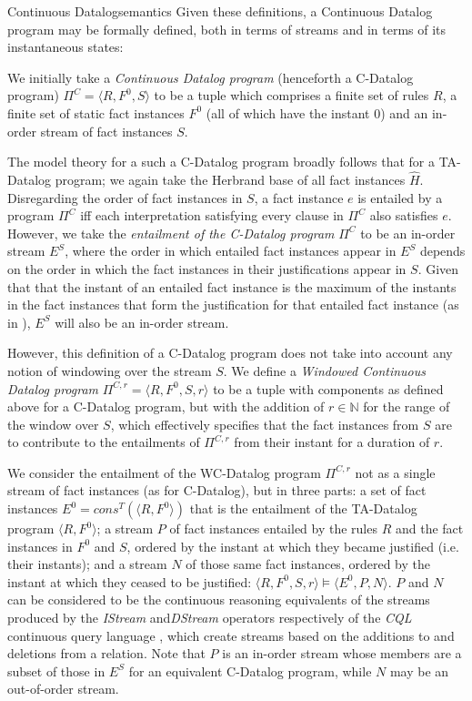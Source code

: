 \begin{nestedsection}{Continuous Datalog}{semantics}
Given these definitions, a Continuous Datalog program may be formally
defined, both in terms of streams and in terms of its instantaneous
states:

\begin{definition}

We initially take a {\em Continuous Datalog program} (henceforth a
C-Datalog program) $\Pi^C = \langle R, F^0, S \rangle$ to be a tuple
which comprises a finite set of rules $R$, a finite set of static fact
instances $F^0$ (all of which have the instant $0$) and an in-order
stream of fact instances $S$.

The model theory for a such a C-Datalog program broadly follows that
for a TA-Datalog program; we again take the Herbrand base of all fact
instances $\hat{H}$. Disregarding the order of fact instances in $S$,
a fact instance $e$ is entailed by a program $\Pi^C$ iff each
interpretation satisfying every clause in $\Pi^C$ also satisfies $e$.
However, we take the {\em entailment of the C-Datalog program} $\Pi^C$
to be an in-order stream $E^S$, where the order in which entailed fact
instances appear in $E^S$ depends on the order in which the fact
instances in their justifications appear in $S$. Given that that the
instant of an entailed fact instance is the maximum of the instants in
the fact instances that form the justification for that entailed fact
instance (as in ),
$E^S$ will also be an in-order stream.

However, this definition of a C-Datalog program does not take into
account any notion of windowing over the stream $S$. We define a {\em
  Windowed Continuous Datalog program} $\Pi^{C, r} = \langle R, F^0, S,
r \rangle$ to be a tuple with components as defined above for a
C-Datalog program, but with the addition of $r \in \mathbb{N}$ for the
range of the window over $S$, which effectively specifies that the
fact instances from $S$ are to contribute to the entailments of $\Pi^{C,r}$
from their instant for a duration of $r$.

We consider the entailment of the WC-Datalog program $\Pi^{C,r}$ not
as a single stream of fact instances (as for C-Datalog), but in three
parts: a set of fact instances $E^0 = cons^T(\langle R, F^0\rangle)$
that is the entailment of the TA-Datalog program $\langle R,
F^0\rangle$; a stream $P$ of fact instances entailed by the rules $R$ and
the fact instances in $F^0$ and $S$, ordered by the instant at which they
became justified (i.e. their instants); and a stream $N$ of those same fact
instances, ordered by the instant at which they ceased to be justified:
$\langle R, F^0, S, r \rangle \models \langle E^0, P, N \rangle$. $P$
and $N$ can be considered to be the continuous reasoning equivalents of
the streams produced by the \emph{IStream} and\emph{DStream} operators
respectively of the \emph{CQL} continuous query language \citep{CQL},
which create streams based on the additions to and deletions from a
relation. Note that $P$ is an in-order stream whose members are a subset
of those in $E^S$ for an equivalent C-Datalog program, while $N$ may be
an out-of-order stream.


\end{definition}
\end{nestedsection}

